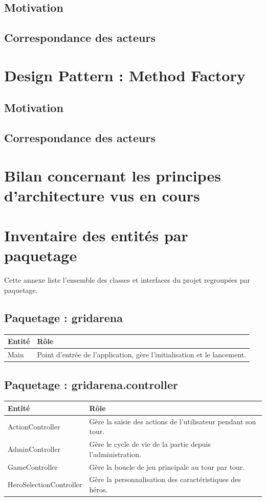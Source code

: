 \documentclass[12pt, a4paper]{article}
\begin{document}
\subsection{Motivation}


\subsection{Correspondance des acteurs}


\section{Design Pattern : Method Factory}
\subsection{Motivation}


\subsection{Correspondance des acteurs}


\section{Bilan concernant les principes d'architecture vus en cours}

\newpage
\appendix
\section{Inventaire des entités par paquetage}
Cette annexe liste l'ensemble des classes et interfaces du projet regroupées par paquetage.

\subsection{Paquetage : gridarena}
\begin{tabular}{|p{7cm}|p{8cm}|}
\hline
\textbf{Entité} & \textbf{Rôle} \\ \hline
Main & Point d'entrée de l'application, gère l'initialisation et le lancement. \\ \hline
\end{tabular}

\subsection{Paquetage : gridarena.controller}
\begin{tabular}{|p{7cm}|p{8cm}|}
\hline
\textbf{Entité} & \textbf{Rôle} \\ \hline
ActionController & Gère la saisie des actions de l'utilisateur pendant son tour. \\ \hline
AdminController & Gère le cycle de vie de la partie depuis l'administration. \\ \hline
GameController & Gère la boucle de jeu principale au tour par tour. \\ \hline
HeroSelectionController & Gère la personnalisation des caractéristiques des héros. \\ \hline
\end{tabular}
\end{document}
